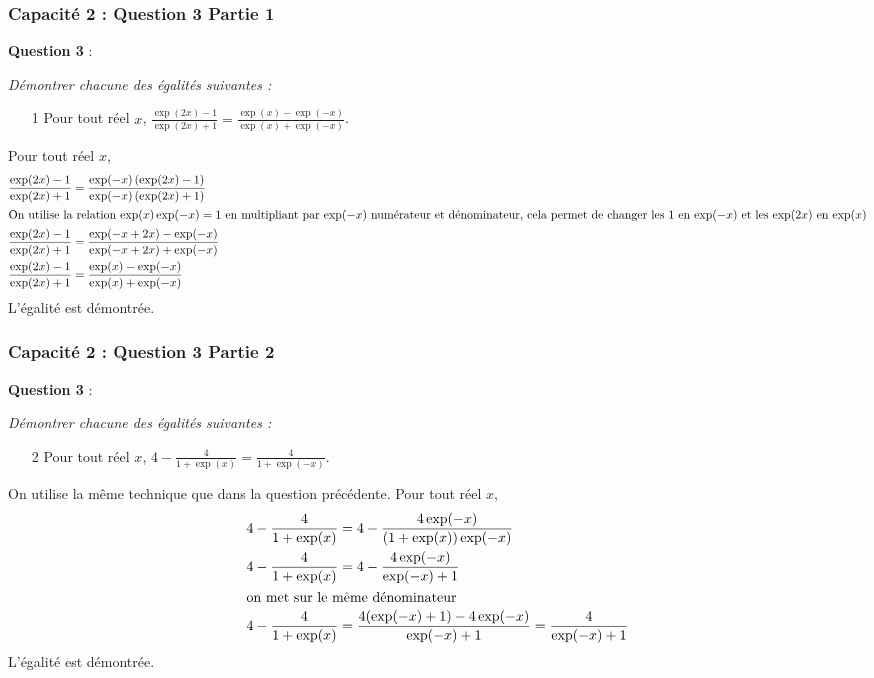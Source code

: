 \documentclass[11pt, hyperref={urlcolor=red,%
            linkcolor=blue, %
            colorlinks=true}]{beamer}
\begin{document}
\begin{frame}
\frametitle{Capacité 2 : Question 3 Partie 1}

 \textbf{Question 3} : {\itshape Démontrer chacune des égalités suivantes :
\begin{enumerate}
	\item[1] Pour tout réel $x$, \: $\frac{\exp(2x)-1}{\exp(2x)+1}=\frac{\exp(x)-\exp(-x)}{\exp(x)+\exp(-x)}$.
\end{enumerate} 
}


Pour tout réel $x$, \: 
\begin{align*}
\frac{\exp(2x)-1}{\exp(2x)+1}&=\frac{\exp(-x)\left( \exp(2x)-1\right)}{\exp(-x)\left( \exp(2x)+1\right)} \\
\intertext{On utilise la relation $\exp(x)\exp(-x)=1$ en multipliant par $\exp(-x)$ numérateur et dénominateur, cela permet de changer les $1$ en $\exp(-x)$ et les $\exp(2x)$ en $\exp(x)$}
 \frac{\exp(2x)-1}{\exp(2x)+1}&=\frac{\exp(-x+2x)-\exp(-x)}{\exp(-x+2x)+\exp(-x)}\\
  \frac{\exp(2x)-1}{\exp(2x)+1}&=\frac{\exp(x)-\exp(-x)}{\exp(x)+\exp(-x)}
\end{align*}
L'égalité est démontrée.
\end{frame}



\begin{frame}
\frametitle{Capacité 2 : Question 3 Partie 2}

 \textbf{Question 3} : {\itshape Démontrer chacune des égalités suivantes :
\begin{enumerate}
	\item[2] Pour tout réel $x$, \:  $4-\frac{4}{1+\exp(x)}= \frac{4}{1+\exp(-x)}$.

\end{enumerate} 
}

On utilise la même technique que dans la question précédente. Pour tout réel $x$, \: 
\begin{align*}
4-\frac{4}{1+\exp(x)}&=4 - \frac{4\exp(-x)}{(1+\exp(x))\exp(-x)} \\
4-\frac{4}{1+\exp(x)}&=4 - \frac{4\exp(-x)}{\exp(-x)+ 1} \\
\intertext{on met sur le même dénominateur}
4-\frac{4}{1+\exp(x)}&= \frac{4(\exp(-x)+ 1  ) - 4\exp(-x)}{\exp(-x)+ 1} = \frac{4}{\exp(-x)+ 1}\\
\end{align*}
L'égalité est démontrée.
\end{frame}
\end{document}
